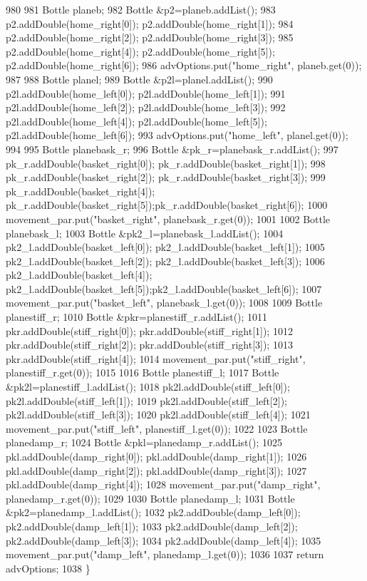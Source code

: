 \begin{DoxyCode}
980 
981     Bottle planeb;
982     Bottle &p2=planeb.addList();
983     p2.addDouble(home\_right[0]); p2.addDouble(home\_right[1]);
984     p2.addDouble(home\_right[2]); p2.addDouble(home\_right[3]);
985     p2.addDouble(home\_right[4]); p2.addDouble(home\_right[5]); p2.addDouble(home\_right[6]);
986     advOptions.put(\textcolor{stringliteral}{"home\_right"}, planeb.get(0));
987 
988     Bottle planel;
989     Bottle &p2l=planel.addList();
990     p2l.addDouble(home\_left[0]); p2l.addDouble(home\_left[1]);
991     p2l.addDouble(home\_left[2]); p2l.addDouble(home\_left[3]);
992     p2l.addDouble(home\_left[4]); p2l.addDouble(home\_left[5]); p2l.addDouble(home\_left[6]);
993     advOptions.put(\textcolor{stringliteral}{"home\_left"}, planel.get(0));
994 
995     Bottle planebask\_r;
996     Bottle &pk\_r=planebask\_r.addList();
997     pk\_r.addDouble(basket\_right[0]); pk\_r.addDouble(basket\_right[1]);
998     pk\_r.addDouble(basket\_right[2]); pk\_r.addDouble(basket\_right[3]);
999     pk\_r.addDouble(basket\_right[4]); pk\_r.addDouble(basket\_right[5]);pk\_r.addDouble(basket\_right[6]);
1000     movement_par.put(\textcolor{stringliteral}{"basket\_right"}, planebask\_r.get(0));
1001 
1002     Bottle planebask\_l;
1003     Bottle &pk2\_l=planebask\_l.addList();
1004     pk2\_l.addDouble(basket\_left[0]); pk2\_l.addDouble(basket\_left[1]);
1005     pk2\_l.addDouble(basket\_left[2]); pk2\_l.addDouble(basket\_left[3]);
1006     pk2\_l.addDouble(basket\_left[4]); pk2\_l.addDouble(basket\_left[5]);pk2\_l.addDouble(basket\_left[6]);
1007     movement_par.put(\textcolor{stringliteral}{"basket\_left"}, planebask\_l.get(0));
1008 
1009     Bottle planestiff\_r;
1010     Bottle &pkr=planestiff\_r.addList();
1011     pkr.addDouble(stiff\_right[0]); pkr.addDouble(stiff\_right[1]);
1012     pkr.addDouble(stiff\_right[2]); pkr.addDouble(stiff\_right[3]);
1013     pkr.addDouble(stiff\_right[4]);
1014     movement_par.put(\textcolor{stringliteral}{"stiff\_right"}, planestiff\_r.get(0));
1015 
1016     Bottle planestiff\_l;
1017     Bottle &pk2l=planestiff\_l.addList();
1018     pk2l.addDouble(stiff\_left[0]); pk2l.addDouble(stiff\_left[1]);
1019     pk2l.addDouble(stiff\_left[2]); pk2l.addDouble(stiff\_left[3]);
1020     pk2l.addDouble(stiff\_left[4]);
1021     movement_par.put(\textcolor{stringliteral}{"stiff\_left"}, planestiff\_l.get(0));
1022 
1023     Bottle planedamp\_r;
1024     Bottle &pkl=planedamp\_r.addList();
1025     pkl.addDouble(damp\_right[0]); pkl.addDouble(damp\_right[1]);
1026     pkl.addDouble(damp\_right[2]); pkl.addDouble(damp\_right[3]);
1027     pkl.addDouble(damp\_right[4]);
1028     movement_par.put(\textcolor{stringliteral}{"damp\_right"}, planedamp\_r.get(0));
1029 
1030     Bottle planedamp\_l;
1031     Bottle &pk2=planedamp\_l.addList();
1032     pk2.addDouble(damp\_left[0]); pk2.addDouble(damp\_left[1]);
1033     pk2.addDouble(damp\_left[2]); pk2.addDouble(damp\_left[3]);
1034     pk2.addDouble(damp\_left[4]);
1035     movement_par.put(\textcolor{stringliteral}{"damp\_left"}, planedamp\_l.get(0));
1036 
1037     \textcolor{keywordflow}{return} advOptions;
1038 \}
\end{DoxyCode}
